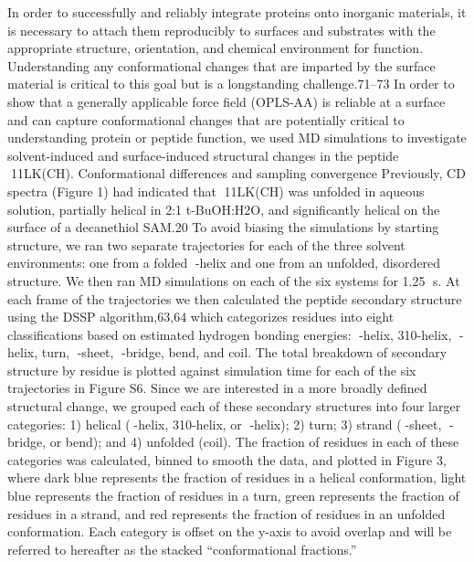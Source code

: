 In order to successfully and reliably integrate proteins onto inorganic materials, it is necessary to attach them reproducibly to surfaces and substrates with the appropriate structure, orientation, and chemical environment for function. Understanding any conformational changes that are imparted by the surface material is critical to this goal but is a longstanding challenge.71–73 In order to show that a generally applicable force field (OPLS-AA) is reliable at a surface and can capture conformational changes that are potentially critical to understanding protein or peptide function, we used MD simulations to investigate solvent-induced and surface-induced structural changes in the peptide 11LK(CH).
Conformational differences and sampling convergence
Previously, CD spectra (Figure 1) had indicated that 11LK(CH) was unfolded in aqueous solution, partially helical in 2:1 t-BuOH:H2O, and significantly helical on the surface of a decanethiol SAM.20 To avoid biasing the simulations by starting structure, we ran two separate trajectories for each of the three solvent environments: one from a folded -helix and one from an unfolded, disordered structure. We then ran MD simulations on each of the six systems for 1.25 s. At each frame of the trajectories we then calculated the peptide secondary structure using the DSSP algorithm,63,64 which categorizes residues into eight classifications based on estimated hydrogen bonding energies: -helix, 310-helix, -helix, turn, -sheet, -bridge, bend, and coil. The total breakdown of secondary structure by residue is plotted against simulation time for each of the six trajectories in Figure S6. Since we are interested in a more broadly defined structural change, we grouped each of these secondary structures into four larger categories: 1) helical (-helix, 310-helix, or -helix); 2) turn; 3) strand (-sheet, -bridge, or bend); and 4) unfolded (coil). The fraction of residues in each of these categories was calculated, binned to smooth the data, and plotted in Figure 3, where dark blue represents the fraction of residues in a helical conformation, light blue represents the fraction of residues in a turn, green represents the fraction of residues in a strand, and red represents the fraction of residues in an unfolded conformation. Each category is offset on the y-axis to avoid overlap and will be referred to hereafter as the stacked “conformational fractions.”
